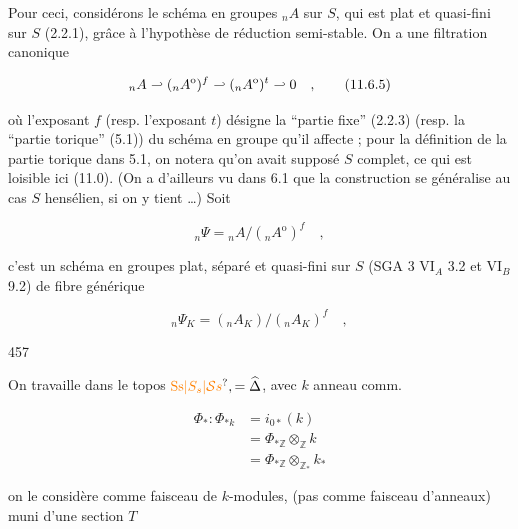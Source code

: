 Pour ceci, considérons le schéma en groupes $ {}_nA$ sur $S$, qui est plat et quasi-fini sur $S$ (2.2.1), grâce à l'hypothèse de réduction semi-stable. On a une filtration canonique


\[
{}_nA\mathrel{\relbar\joinrel\rhook}({}_nA^{\mathrm{o}})^f\mathrel{\relbar\joinrel\rhook}({}_nA^{\mathrm{o}})^t\mathrel{\relbar\joinrel\rhook}0\quad,\tag*{(11.6.5)}
\]

où l'exposant $f$ (resp. l'exposant $t$) désigne la ``partie fixe'' (2.2.3) (resp. la ``partie torique'' (5.1)) du schéma en groupe qu'il affecte ; pour la définition de la partie torique dans 5.1, on notera qu'on avait supposé $S$ complet, ce qui est loisible ici (11.0). (On a d'ailleurs vu dans 6.1 que la construction se généralise au cas $S$ hensélien, si on y tient \ldots) Soit

\[
{}_n\Psi={}_nA/({}_nA^{\mathrm{o}})^f\quad,\tag*{(11.6.6)}
\]

c'est un schéma en groupes plat, séparé et quasi-fini sur $S$ (SGA 3 $\mathrm{VI}_A$ 3.2 et $\mathrm{VI}_B$ 9.2) de fibre générique

\[
{}_n\Psi_K=({}_nA_K)/({}_nA_K)^f\quad,
\]


457


On travaille dans le topos  $\unsure{\mathrm{Ss}|S_s|\mathcal{S}s},=\widehat{\Delta}$, avec $k$ anneau comm.

\[
\begin{aligned}
\Phi_*:\Phi_{*k}&=i_{0*}(k)\\
&=\Phi_{*\mathbb Z}\otimes_{\mathbb Z}k\\
&=\Phi_{*\mathbb Z}\otimes_{\mathbb Z_*}k_*
\end{aligned}
\]

 on le considère comme faisceau de $k$-modules, (pas comme faisceau d'anneaux) muni d'une section $T$

